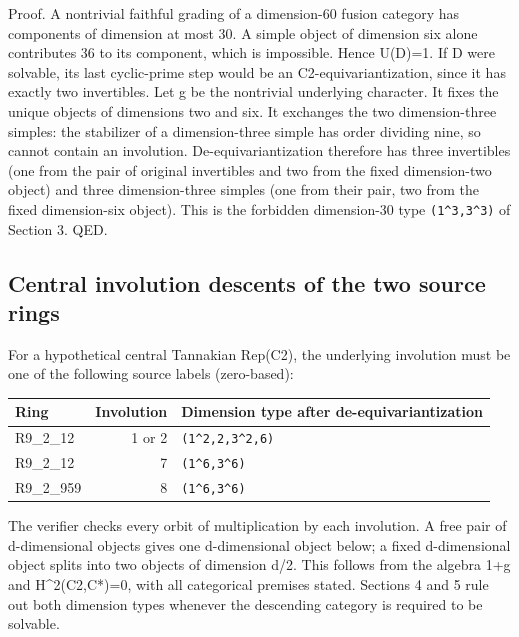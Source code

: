 Proof. A nontrivial faithful grading of a dimension-60 fusion category
has components of dimension at most 30. A simple object of dimension six
alone contributes 36 to its component, which is impossible. Hence
U(D)=1. If D were solvable, its last cyclic-prime step would be an
C2-equivariantization, since it has exactly two invertibles. Let g be
the nontrivial underlying character. It fixes the unique objects of
dimensions two and six. It exchanges the two dimension-three simples:
the stabilizer of a dimension-three simple has order dividing nine, so
cannot contain an involution. De-equivariantization therefore has three
invertibles (one from the pair of original invertibles and two from the
fixed dimension-two object) and three dimension-three simples (one from
their pair, two from the fixed dimension-six object). This is the
forbidden dimension-30 type
\texttt{(1\textasciicircum{}3,3\allowbreak{}\textasciicircum{}3)} of
Section 3. QED.

\hypertarget{central-involution-descents-of-the-two-source-rings}{%
\subsection{Central involution descents of the two source
rings}\label{central-involution-descents-of-the-two-source-rings}}

For a hypothetical central Tannakian Rep(C2), the underlying involution
must be one of the following source labels (zero-based):

\begin{longtable}[]{@{}lrl@{}}
\toprule\noalign{}
Ring & Involution & Dimension type after de-equivariantization \\
\midrule\noalign{}
\endhead
\bottomrule\noalign{}
\endlastfoot
R9\_2\_12 & 1 or 2 &
\texttt{(1\textasciicircum{}2,2\allowbreak{},3\textasciicircum{}2,6\allowbreak{})} \\
R9\_2\_12 & 7 &
\texttt{(1\textasciicircum{}6,3\allowbreak{}\textasciicircum{}6)} \\
R9\_2\_959 & 8 &
\texttt{(1\textasciicircum{}6,3\allowbreak{}\textasciicircum{}6)} \\
\end{longtable}

The verifier checks every orbit of multiplication by each involution. A
free pair of d-dimensional objects gives one d-dimensional object below;
a fixed d-dimensional object splits into two objects of dimension d/2.
This follows from the algebra 1+g and H\^{}2(C2,C*)=0, with all
categorical premises stated. Sections 4 and 5 rule out both dimension
types whenever the descending category is required to be solvable.

